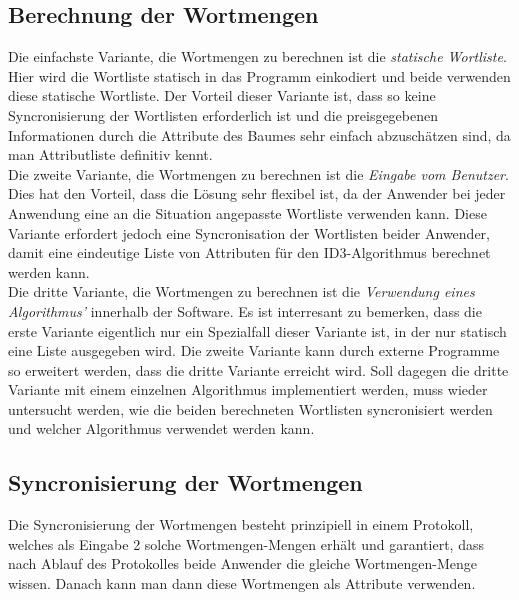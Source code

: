 \documentclass{article}
\theoremstyle{definition}
\theoremstyle{remark}
\begin{document}
\subsection{Berechnung der Wortmengen}
Die einfachste Variante, die Wortmengen zu berechnen ist die {\em statische
Wortliste}. Hier wird die Wortliste statisch in das Programm einkodiert
und beide verwenden diese statische Wortliste. Der Vorteil dieser
Variante ist, dass so keine Syncronisierung der Wortlisten erforderlich ist
und die preisgegebenen Informationen durch die Attribute des Baumes
sehr einfach abzusch\"atzen sind, da man Attributliste definitiv kennt.\\
Die zweite Variante, die Wortmengen zu berechnen ist die {\em Eingabe
vom Benutzer}. Dies hat den Vorteil, dass die L\"osung sehr flexibel ist,
da der Anwender bei jeder Anwendung eine an die Situation angepasste
Wortliste verwenden kann. Diese Variante erfordert jedoch eine Syncronisation
der Wortlisten beider Anwender, damit eine eindeutige Liste von Attributen
f\"ur den ID3-Algorithmus berechnet werden kann.\\
Die dritte Variante, die Wortmengen zu berechnen ist die {\em Verwendung
eines Algorithmus'} innerhalb der Software. Es ist interresant zu bemerken,
dass die erste Variante eigentlich nur ein Spezialfall dieser Variante ist,
in der nur statisch eine Liste ausgegeben wird. Die zweite Variante kann
durch externe Programme so erweitert werden, dass die dritte Variante erreicht
wird. Soll dagegen die dritte Variante mit einem einzelnen Algorithmus
implementiert werden, muss wieder untersucht werden, wie die beiden
berechneten Wortlisten syncronisiert werden und welcher Algorithmus verwendet
werden kann.\\

\subsection{Syncronisierung der Wortmengen}
Die Syncronisierung der Wortmengen besteht prinzipiell in einem Protokoll,
welches als Eingabe 2 solche Wortmengen-Mengen erh\"alt und garantiert, dass
nach Ablauf des Protokolles beide Anwender die gleiche Wortmengen-Menge 
wissen. Danach kann man dann diese Wortmengen als Attribute verwenden.\\
\end{document}
